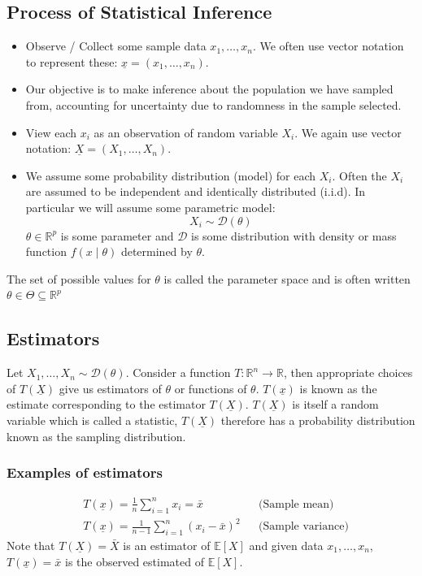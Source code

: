 \documentclass[12pt]{article}
\begin{document}
\subsection{Process of Statistical Inference}
\begin{itemize}
    \item Observe / Collect some sample data \(x_1,\dots,x_n\). We often use vector notation to represent these: \(\underline{x}=(x_1,\dots,x_n)\).
    \item Our objective is to make inference about the population we have sampled from, accounting for uncertainty due to randomness in the sample selected.
    \item View each \(x_i\) as an observation of random variable \(X_i\). We again use vector notation: \(\underline{X}=(X_1,\dots,X_n)\).
    \item We assume some probability distribution (model) for each \(X_i\). Often the \(X_i\) are assumed to be independent and identically distributed (i.i.d). In particular we will assume some parametric model:
    \[X_i\sim \mathcal{D}(\theta)\]
    \(\theta\in\mathbb{R}^p\) is some parameter and \(\mathcal{D}\) is some distribution with density or mass function \(f(x\mid\theta)\) determined by \(\theta\).
\end{itemize}
The set of possible values for \(\theta\) is called the parameter space and is often written \(\theta\in\Theta\subseteq\mathbb{R}^p\)
\subsection{Estimators}
Let \(X_1,\dots,X_n\sim \mathcal{D}(\theta)\). Consider a function \(T:\mathbb{R}^n\to\mathbb{R}\), then appropriate choices of \(T(\underline{X})\) give us estimators of \(\theta\) or functions of \(\theta\). \(T(\underline{x})\) is known as the estimate corresponding to the estimator \(T(\underline{X})\). \(T(\underline{X})\) is itself a random variable which is called a statistic, \(T(\underline{X})\) therefore has a probability distribution known as the sampling distribution.
\subsubsection{Examples of estimators}
\begin{align*}
    &T(\underline{x})=\frac{1}{n}\sum^n_{i=1}x_i=\bar{x} && \text{(Sample mean)} \\
    &T(\underline{x})=\frac{1}{n-1}\sum^n_{i=1}(x_i-\bar{x})^2 && \text{(Sample variance)}
\end{align*}
Note that \(T(\underline{X})=\bar{X}\) is an estimator of \(\mathbb{E}[X]\) and given data \(x_1,\dots,x_n\), \(T(\underline{x})=\bar{x}\) is the observed estimated of \(\mathbb{E}[X]\).
\clearpage
\end{document}
